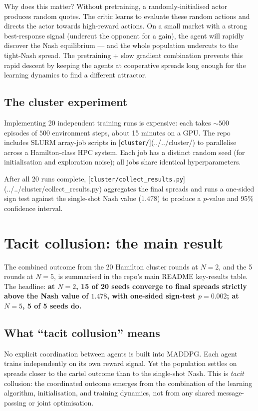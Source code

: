 Why does this matter? Without pretraining, a randomly-initialised actor produces random quotes. The critic learns to evaluate these random actions and directs the actor towards high-reward actions. On a small market with a strong best-response signal (undercut the opponent for a gain), the agent will rapidly discover the Nash equilibrium --- and the whole population undercuts to the tight-Nash spread. The pretraining + slow gradient combination prevents this rapid descent by keeping the agents at cooperative spreads long enough for the learning dynamics to find a different attractor.

\subsection{The cluster experiment}

Implementing 20 independent training runs is expensive: each takes $\sim 500$ episodes of $500$ environment steps, about 15 minutes on a GPU. The repo includes SLURM array-job scripts in [\texttt{cluster/}](../../cluster/) to parallelise across a Hamilton-class HPC system. Each job has a distinct random seed (for initialisation and exploration noise); all jobs share identical hyperparameters.

After all 20 runs complete, [\texttt{cluster/collect\_results.py}](../../cluster/collect_results.py) aggregates the final spreads and runs a one-sided sign test against the single-shot Nash value ($1.478$) to produce a $p$-value and 95\% confidence interval.

\section{Tacit collusion: the main result}
\label{sec:tacit-collusion}

The combined outcome from the 20 Hamilton cluster rounds at $N = 2$, and the 5 rounds at $N = 5$, is summarised in the repo's main README key-results table. The headline: \textbf{at $N = 2$, 15 of 20 seeds converge to final spreads strictly above the Nash value of $1.478$, with one-sided sign-test $p = 0.002$; at $N = 5$, 5 of 5 seeds do.}

\subsection{What ``tacit collusion'' means}

No explicit coordination between agents is built into MADDPG. Each agent trains independently on its own reward signal. Yet the population settles on spreads closer to the cartel outcome than to the single-shot Nash. This is \emph{tacit} collusion: the coordinated outcome emerges from the combination of the learning algorithm, initialisation, and training dynamics, not from any shared message-passing or joint optimisation.

